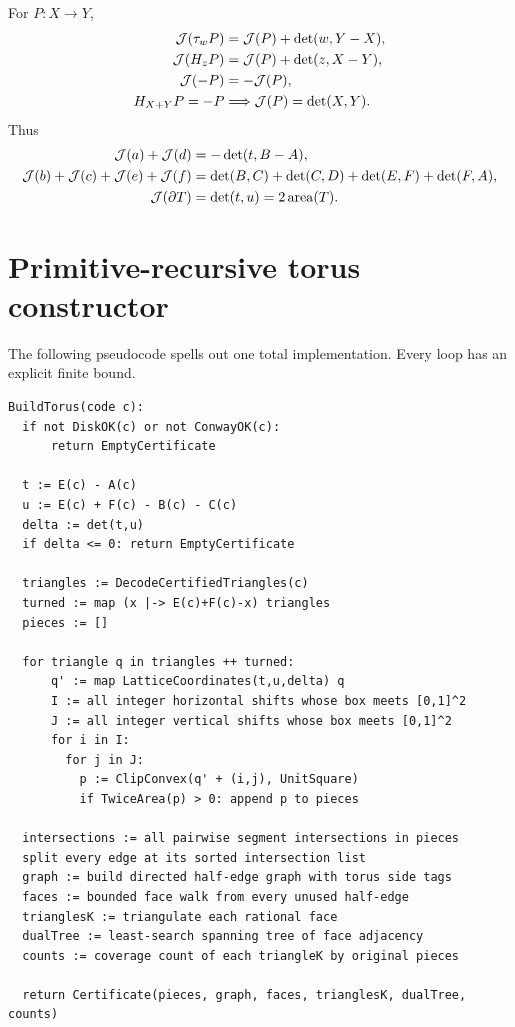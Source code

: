 For \(P:X\to Y\),
\begin{align*}
 \mathcal J(\tau_wP)&=\mathcal J(P)+\det(w,Y-X),\\
 \mathcal J(H_zP)&=\mathcal J(P)+\det(z,X-Y),\\
 \mathcal J(-P)&=-\mathcal J(P),\\
 H_{X+Y}P=-P&\Longrightarrow \mathcal J(P)=\det(X,Y).
\end{align*}
Thus
\begin{align*}
 \mathcal J(a)+\mathcal J(d)&=-\det(t,B-A),\\
 \mathcal J(b)+\mathcal J(c)+\mathcal J(e)+\mathcal J(f)
 &=\det(B,C)+\det(C,D)+\det(E,F)+\det(F,A),\\
 \mathcal J(\partial T)&=\det(t,u)=2\operatorname{area}(T).
\end{align*}

\section{Primitive-recursive torus constructor}
\label{app:algorithm}

The following pseudocode spells out one total implementation.  Every loop has an explicit finite bound.

\begin{lstlisting}
BuildTorus(code c):
  if not DiskOK(c) or not ConwayOK(c):
      return EmptyCertificate

  t := E(c) - A(c)
  u := E(c) + F(c) - B(c) - C(c)
  delta := det(t,u)
  if delta <= 0: return EmptyCertificate

  triangles := DecodeCertifiedTriangles(c)
  turned := map (x |-> E(c)+F(c)-x) triangles
  pieces := []

  for triangle q in triangles ++ turned:
      q' := map LatticeCoordinates(t,u,delta) q
      I := all integer horizontal shifts whose box meets [0,1]^2
      J := all integer vertical shifts whose box meets [0,1]^2
      for i in I:
        for j in J:
          p := ClipConvex(q' + (i,j), UnitSquare)
          if TwiceArea(p) > 0: append p to pieces

  intersections := all pairwise segment intersections in pieces
  split every edge at its sorted intersection list
  graph := build directed half-edge graph with torus side tags
  faces := bounded face walk from every unused half-edge
  trianglesK := triangulate each rational face
  dualTree := least-search spanning tree of face adjacency
  counts := coverage count of each triangleK by original pieces

  return Certificate(pieces, graph, faces, trianglesK, dualTree, counts)
\end{lstlisting}

